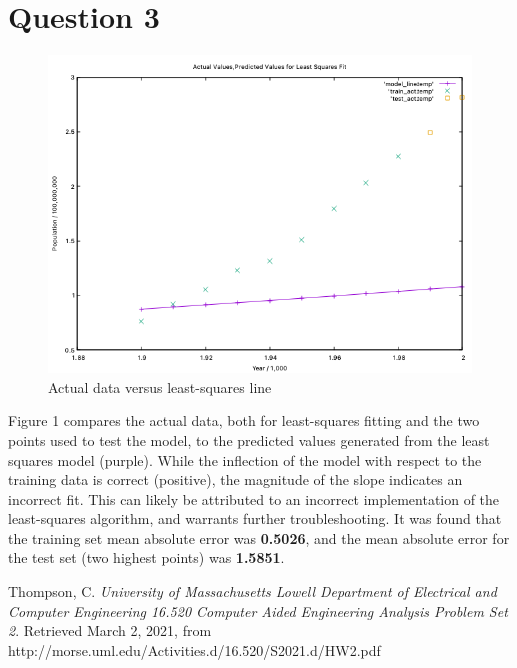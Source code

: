 \documentclass{report}
\begin{document}
	\section*{Question 3}
	
	\begin{figure}[!ht]
		\centering
		\includegraphics[scale=0.7]{figures/q3_results.png}
		\caption{Actual data versus least-squares line}
	\end{figure}

	Figure 1 compares the actual data, both for least-squares fitting and the two points used to test the model, to the predicted values generated from the least squares model (purple). While the inflection of the model with respect to the training data is correct (positive), the magnitude of the slope indicates an incorrect fit. This can likely be attributed to an incorrect implementation of the least-squares algorithm, and warrants further troubleshooting. It was found that the training set mean absolute error was \textbf{0.5026}, and the mean absolute error for the test set (two highest points) was \textbf{1.5851}.

	\begin{thebibliography}{99\kern\bibindent}
	
	Thompson, C.
	\textit{University of Massachusetts Lowell Department of Electrical and Computer Engineering 16.520 Computer Aided Engineering Analysis Problem Set 2}.
	Retrieved March 2, 2021, from http://morse.uml.edu/Activities.d/16.520/S2021.d/HW2.pdf
	
	\end{thebibliography}
\end{document}
